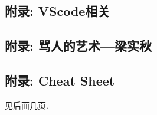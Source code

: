 \documentclass[a4paper, twoside]{article}
\begin{document}
\begin{multicols}{2}



			
			\subsection{附录: VScode相关}
				
			
			\subsection{附录: 骂人的艺术—梁实秋}
				
			
			\subsection{附录: Cheat Sheet}
				见后面几页.

	\end{multicols}

	

	

	

	\pagestyle{empty}

	\newpage

	\null


\end{document}
